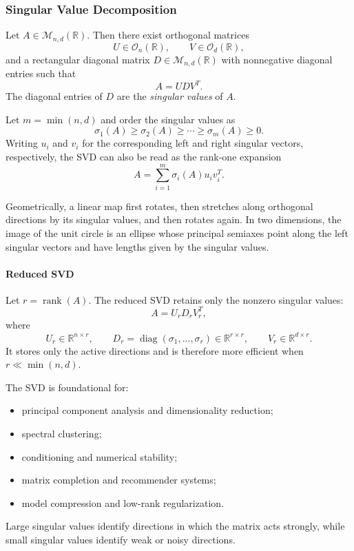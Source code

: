 \documentclass[12pt,oneside]{book}
\numberwithin{equation}{section}
\theoremstyle{definition}
\theoremstyle{plain}
\theoremstyle{remark}
\newcommand{\R}{\mathbb{R}}
\newcommand{\rank}{\operatorname{rank}}
\newcommand{\diag}{\operatorname{diag}}
\begin{document}
\subsubsection{Singular Value Decomposition}
Let $A\in\mathcal{M}_{n,d}(\R)$. Then there exist orthogonal matrices
\[
U\in\mathcal{O}_n(\R),
\qquad
V\in\mathcal{O}_d(\R),
\]
and a rectangular diagonal matrix $D\in\mathcal{M}_{n,d}(\R)$ with nonnegative diagonal entries such that
\[
A=UDV^T.
\]
The diagonal entries of $D$ are the \emph{singular values} of $A$.

Let $m=\min(n,d)$ and order the singular values as
\[
\sigma_1(A)\geq\sigma_2(A)\geq\cdots
\geq\sigma_m(A)\geq0.
\]
Writing $u_i$ and $v_i$ for the corresponding left and right singular vectors, respectively, the SVD can also be read as the rank-one expansion
\[
A=\sum_{i=1}^m\sigma_i(A)u_iv_i^T.
\]

Geometrically, a linear map first rotates, then stretches along orthogonal directions by its singular values, and then rotates again. In two dimensions, the image of the unit circle is an ellipse whose principal semiaxes point along the left singular vectors and have lengths given by the singular values.

\paragraph{Reduced SVD}
Let $r=\rank(A)$. The reduced SVD retains only the nonzero singular values:
\[
A=U_rD_rV_r^T,
\]
where
\[
U_r\in\R^{n\times r},
\qquad
D_r=\diag(\sigma_1,\ldots,\sigma_r)\in\R^{r\times r},
\qquad
V_r\in\R^{d\times r}.
\]
It stores only the active directions and is therefore more efficient when $r\ll\min(n,d)$.

The SVD is foundational for:
\begin{itemize}
    \item principal component analysis and dimensionality reduction;
    \item spectral clustering;
    \item conditioning and numerical stability;
    \item matrix completion and recommender systems;
    \item model compression and low-rank regularization.
\end{itemize}
Large singular values identify directions in which the matrix acts strongly, while small singular values identify weak or noisy directions.
\end{document}

